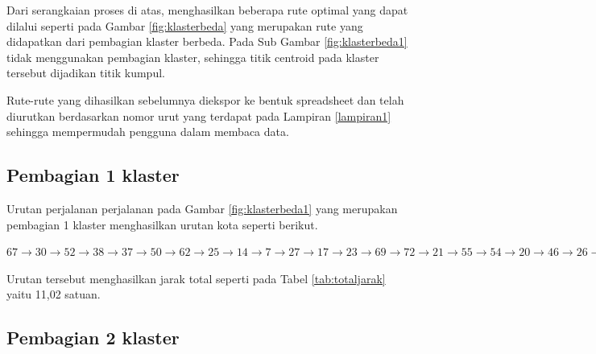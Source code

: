 Dari serangkaian proses di atas, menghasilkan beberapa rute optimal yang dapat dilalui seperti pada Gambar \ref{fig:klasterbeda} yang merupakan rute yang didapatkan dari pembagian klaster berbeda. Pada Sub Gambar \ref{fig:klasterbeda1} tidak menggunakan pembagian klaster, sehingga titik centroid pada klaster tersebut dijadikan titik kumpul.




Rute-rute yang dihasilkan sebelumnya diekspor ke bentuk spreadsheet dan telah diurutkan berdasarkan nomor urut yang terdapat pada Lampiran \ref{lampiran1} sehingga mempermudah pengguna dalam membaca data.

\subsection{Pembagian 1 klaster}

Urutan perjalanan perjalanan pada Gambar \ref{fig:klasterbeda1} yang merupakan pembagian 1 klaster menghasilkan urutan kota seperti berikut.

\noindent $
67 \rightarrow 30 \rightarrow 52 \rightarrow 38 \rightarrow 37 \rightarrow 50 \rightarrow 62 \rightarrow 25 \rightarrow 14 \rightarrow 7 \rightarrow 27 \rightarrow 17 \rightarrow 23 \rightarrow 69 \rightarrow 72 \rightarrow 21 \rightarrow 55 \rightarrow 54 \rightarrow 20 \rightarrow 46 \rightarrow 26 \rightarrow 59 \rightarrow 60 \rightarrow 16 \rightarrow 58 \rightarrow 45 \rightarrow 15 \rightarrow 65 \rightarrow 36 \rightarrow 18 \rightarrow 40 \rightarrow 70 \rightarrow 75 \rightarrow 2 \rightarrow 44 \rightarrow 11 \rightarrow 41 \rightarrow 53 \rightarrow 3 \rightarrow 71 \rightarrow 10 \rightarrow 6 \rightarrow 29 \rightarrow 74 \rightarrow 68 \rightarrow 47 \rightarrow 32 \rightarrow 56 \rightarrow 63 \rightarrow 9 \rightarrow 51 \rightarrow 49 \rightarrow 35 \rightarrow 1 \rightarrow 73 \rightarrow 24 \rightarrow 33 \rightarrow 57 \rightarrow 61 \rightarrow 22 \rightarrow 34 \rightarrow 8 \rightarrow 43 \rightarrow 66 \rightarrow 42 \rightarrow 13 \rightarrow 5 \rightarrow 4 \rightarrow 64 \rightarrow 31 \rightarrow 39 \rightarrow 19 \rightarrow 28 \rightarrow 48 \rightarrow 12$

Urutan tersebut menghasilkan jarak total seperti pada Tabel \ref{tab:totaljarak} yaitu 11,02 satuan.

\subsection{Pembagian 2 klaster}

